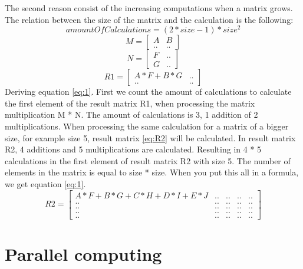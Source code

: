 The second reason consist of the increasing computations when a matrix grows. The relation between the size of the matrix and the calculation is the following:
\begin{equation} \label{eq:1}
amountOfCalculations = (2*size-1)*size^2
\end{equation}
\begin{equation}
	M =	\begin{bmatrix}
	A & B \\[0.2em]
	.. & ..
	\end{bmatrix}
\end{equation}
\begin{equation}
	N =	\begin{bmatrix}
	F & .. \\[0.2em]
	G & ..
	\end{bmatrix}
\end{equation}
\begin{equation} \label{eq:R1}
	R1 =	\begin{bmatrix}
	A*F+B*G & .. \\[0.2em]
	.. & ..
	\end{bmatrix}
\end{equation}
Deriving equation \ref{eq:1}. First we count the amount of calculations to calculate the first element of the result matrix R1, when processing the matrix multiplication M * N. The amount of calculations is 3, 1 addition of 2 multiplications. When processing the same calculation for a matrix of a bigger size, for example size 5, result matrix \ref{eq:R2} will be calculated. In result matrix R2, 4 additions and 5 multiplications are calculated. Resulting in 4 * 5 calculations in the first element of result matrix R2 with size 5. The number of elements in the matrix is equal to size * size. When you put this all in a formula, we get equation \ref{eq:1}.
\begin{equation} \label{eq:R2}
	R2 =	\begin{bmatrix}
	A*F+B*G+C*H+D*I+E*J & .. & .. & .. & .. \\[0.5em]
	.. & .. & .. & .. & .. \\[0.5em]
	.. & .. & .. & .. & .. \\[0.5em]
	.. & .. & .. & .. & .. \\[0.5em]
	.. & .. & .. & .. & ..
	\end{bmatrix}
\end{equation}





	\section{Parallel computing}
